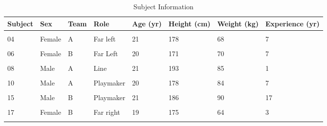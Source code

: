 \documentclass[
]{article}
\begin{document}
\begin{table}[H]

\caption{\label{tab:subjectInfo}Subject Information}
\centering
\begin{tabular}[t]{l|l|l|l|l|l|l|l}
\hline
\textbf{Subject} & \textbf{Sex} & \textbf{Team} & \textbf{Role} & \textbf{Age (yr)} & \textbf{Height (cm)} & \textbf{Weight (kg)} & \textbf{Experience (yr)}\\
\hline
\cellcolor{gray!6}{02} & \cellcolor{gray!6}{Male} & \cellcolor{gray!6}{B} & \cellcolor{gray!6}{Right} & \cellcolor{gray!6}{22} & \cellcolor{gray!6}{181} & \cellcolor{gray!6}{95} & \cellcolor{gray!6}{8}\\
\hline
04 & Female & A & Far left & 21 & 178 & 68 & 7\\
\hline
\cellcolor{gray!6}{05} & \cellcolor{gray!6}{Female} & \cellcolor{gray!6}{B} & \cellcolor{gray!6}{Left} & \cellcolor{gray!6}{23} & \cellcolor{gray!6}{164} & \cellcolor{gray!6}{72} & \cellcolor{gray!6}{1}\\
\hline
06 & Female & B & Far Left & 20 & 171 & 70 & 7\\
\hline
\cellcolor{gray!6}{07} & \cellcolor{gray!6}{Female} & \cellcolor{gray!6}{A} & \cellcolor{gray!6}{Right} & \cellcolor{gray!6}{22} & \cellcolor{gray!6}{179} & \cellcolor{gray!6}{72} & \cellcolor{gray!6}{10}\\
\hline
08 & Male & A & Line & 21 & 193 & 85 & 1\\
\hline
\cellcolor{gray!6}{09} & \cellcolor{gray!6}{Female} & \cellcolor{gray!6}{A} & \cellcolor{gray!6}{Far right} & \cellcolor{gray!6}{20} & \cellcolor{gray!6}{175} & \cellcolor{gray!6}{76} & \cellcolor{gray!6}{5}\\
\hline
10 & Male & A & Playmaker & 20 & 178 & 84 & 7\\
\hline
\cellcolor{gray!6}{11} & \cellcolor{gray!6}{Male} & \cellcolor{gray!6}{A} & \cellcolor{gray!6}{Left} & \cellcolor{gray!6}{26} & \cellcolor{gray!6}{186} & \cellcolor{gray!6}{85} & \cellcolor{gray!6}{9}\\
\hline
15 & Male & B & Playmaker & 21 & 186 & 90 & 17\\
\hline
\cellcolor{gray!6}{16} & \cellcolor{gray!6}{Female} & \cellcolor{gray!6}{B} & \cellcolor{gray!6}{Line} & \cellcolor{gray!6}{22} & \cellcolor{gray!6}{183} & \cellcolor{gray!6}{78} & \cellcolor{gray!6}{5}\\
\hline
17 & Female & B & Far right & 19 & 175 & 64 & 3\\
\hline
\hline
\cellcolor{gray!6}{$Average \pm sd$} & \cellcolor{gray!6}{} & \cellcolor{gray!6}{} & \cellcolor{gray!6}{} & \cellcolor{gray!6}{$21 \pm 2$} & \cellcolor{gray!6}{$179 \pm 7$} & \cellcolor{gray!6}{$78 \pm 9$} & \cellcolor{gray!6}{$7 \pm 4$}\\
\hline
\end{tabular}
\end{table}
\end{document}
